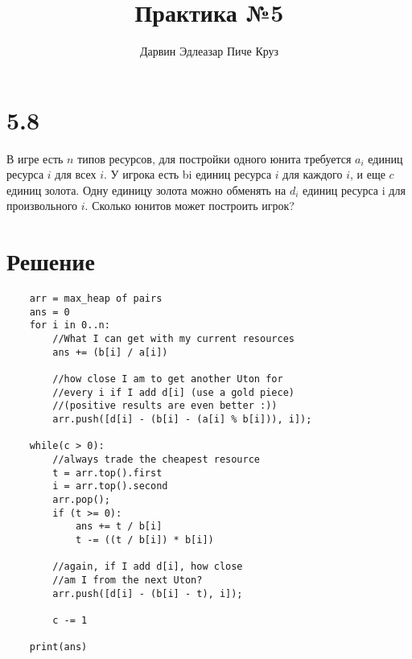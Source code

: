 \documentclass{article}
\title{Практика №5}
\author{Дарвин Эдлеазар Пиче Круз}
\begin{document}
\maketitle

\section*{5.8}

В игре есть $n$ типов ресурсов, для постройки одного юнита требуется $a_i$ единиц ресурса $i$ для всех $i$. У игрока есть bi единиц ресурса $i$ для каждого $i$, и еще $c$ единиц золота.
Одну единицу золота можно обменять на $d_i$ единиц ресурса i для произвольного $i$.
Сколько юнитов может построить игрок?

\section*{Решение}

\begin{lstlisting}
    arr = max_heap of pairs
    ans = 0
    for i in 0..n:
        //What I can get with my current resources
        ans += (b[i] / a[i])
        
        //how close I am to get another Uton for 
        //every i if I add d[i] (use a gold piece)
        //(positive results are even better :))
        arr.push([d[i] - (b[i] - (a[i] % b[i])), i]);
    
    while(c > 0):
        //always trade the cheapest resource
        t = arr.top().first
        i = arr.top().second
        arr.pop();
        if (t >= 0):
            ans += t / b[i]
            t -= ((t / b[i]) * b[i])
        
        //again, if I add d[i], how close 
        //am I from the next Uton?
        arr.push([d[i] - (b[i] - t), i]);
        
        c -= 1
        
    print(ans)
\end{lstlisting}
\end{document}

